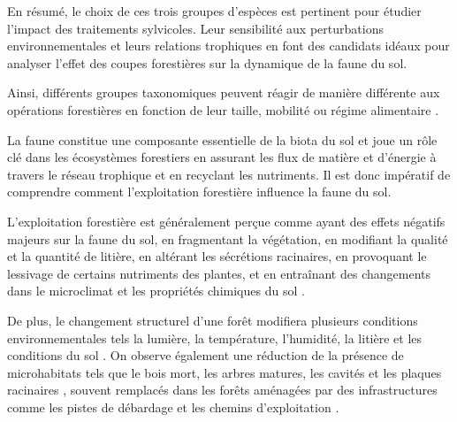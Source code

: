 En résumé, le choix de ces trois groupes d'espèces est pertinent pour étudier l'impact des traitements sylvicoles. 
Leur sensibilité aux perturbations environnementales et leurs relations trophiques en font des candidats idéaux pour analyser l'effet des coupes forestières sur la dynamique de la faune du sol.


Ainsi, différents groupes taxonomiques peuvent réagir de manière différente aux opérations forestières en fonction de leur taille, mobilité ou régime alimentaire \citep{Barlow2007Quantifyingbiodiversity,Stork2009Vulnerabilityresilience}.


La faune constitue une composante essentielle de la biota du sol et joue un rôle clé dans les écosystèmes forestiers en assurant les flux de matière et d'énergie à travers le réseau trophique et en recyclant les nutriments. 
Il est donc impératif de comprendre comment l'exploitation forestière influence la faune du sol.




L'exploitation forestière est généralement perçue comme ayant des effets négatifs majeurs sur la faune du sol, en fragmentant la végétation, 
en modifiant la qualité et la quantité de litière, en altérant les sécrétions racinaires, 
en provoquant le lessivage de certains nutriments des plantes, et en entraînant des changements dans le microclimat et les propriétés chimiques du sol \citep{Marshall2000Impactsforest}.


De plus, le changement structurel d'une forêt modifiera plusieurs conditions environnementales tels la lumière, la température, l'humidité, la litière et les conditions du sol \citep{Sebastia2005Plantdiversity,Michal2014Responsessmall,James2016effectharvest,Zhang2022Intensiveforest}. 
On observe également une réduction de la présence de microhabitats tels que le bois mort, les arbres matures, les cavités et les plaques racinaires \citep{Berg1994ThreatenedPlant,Spies1999Dynamicforest,Bouget2005Shorttermeffect,Christensen2005Deadwood,Brassard2008EffectsForest}, souvent remplacés dans les forêts aménagées par des infrastructures comme les pistes de débardage et les chemins d'exploitation \citep{Hansen1991ConservingBiodiversity,}. 

